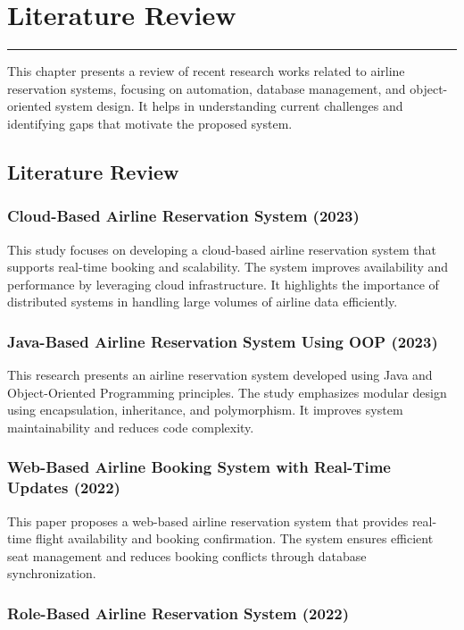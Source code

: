 \chapter{Literature Review}
\noindent\rule{\linewidth}{2pt}
This chapter presents a review of recent research works related to airline reservation systems, focusing on automation, database management, and object-oriented system design. It helps in understanding current challenges and identifying gaps that motivate the proposed system.

\section{Literature Review}

\subsection{Cloud-Based Airline Reservation System (2023)}

This study focuses on developing a cloud-based airline reservation system that supports real-time booking and scalability. The system improves availability and performance by leveraging cloud infrastructure. It highlights the importance of distributed systems in handling large volumes of airline data efficiently.

\subsection{Java-Based Airline Reservation System Using OOP (2023)}

This research presents an airline reservation system developed using Java and Object-Oriented Programming principles. The study emphasizes modular design using encapsulation, inheritance, and polymorphism. It improves system maintainability and reduces code complexity.

\subsection{Web-Based Airline Booking System with Real-Time Updates (2022)}

This paper proposes a web-based airline reservation system that provides real-time flight availability and booking confirmation. The system ensures efficient seat management and reduces booking conflicts through database synchronization.

\subsection{Role-Based Airline Reservation System (2022)}

